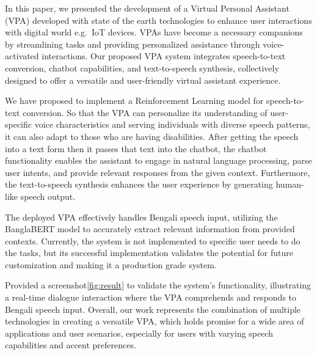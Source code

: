 In this paper, we presented the development of a Virtual Personal Assistant (VPA) developed with state of the earth technologies to enhance user interactions with digital world e.g.\ IoT devices.
VPAs have become a necessary companions by streamlining tasks and providing personalized assistance through voice-activated interactions.
Our proposed VPA system integrates speech-to-text conversion, chatbot capabilities, and text-to-speech synthesis, collectively designed to offer a versatile and user-friendly virtual assistant experience.

We have proposed to implement a Reinforcement Learning model for speech-to-text conversion.
So that the VPA can personalize its understanding of user-specific voice characteristics and serving individuals with diverse speech patterns, it can also adapt to those who are having disabilities.
After getting the speech into a text form then it passes that text into the chatbot, the chatbot functionality enables the assistant to engage in natural language processing, parse user intents, and provide relevant responses from the given context.
Furthermore, the text-to-speech synthesis enhances the user experience by generating human-like speech output.

The deployed VPA effectively handles Bengali speech input, utilizing the BanglaBERT model to accurately extract relevant information from provided contexts.
Currently, the system is not implemented to specific user needs to do the tasks, but its successful implementation validates the potential for future customization and making it a production grade system.

Provided a screenshot\ref{fig:result} to validate the system's functionality, illustrating a real-time dialogue interaction where the VPA comprehends and responds to Bengali speech input.
Overall, our work represents the combination of multiple technologies in creating a versatile VPA, which holds promise for a wide area of applications and user scenarios, especially for users with varying speech capabilities and accent preferences.
